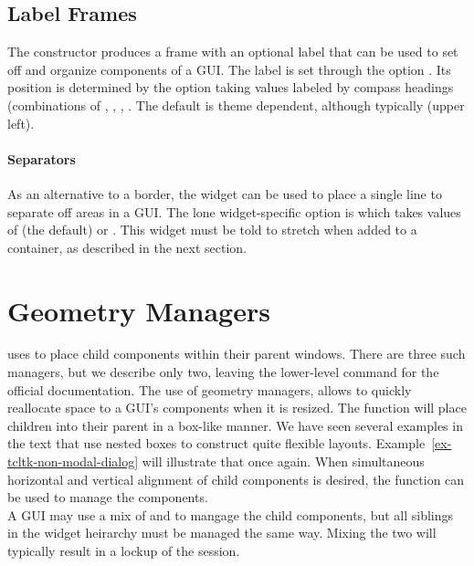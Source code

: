 \subsection{Label Frames}
\label{sec:tcltk:label-frames}

The  constructor produces a frame with an
optional label that can be used to set off and organize components of
a GUI. The label is set through the option
. Its position is determined by the option
 taking values labeled by compass
headings (combinations of , , , . The
default is theme dependent, although typically  (upper
left).

\paragraph{Separators}
As an alternative to a border, the  widget can be used
to place a single line to separate off areas in a GUI. The lone
widget-specific option is  which takes
values of  (the default) or . This
widget must be told to stretch when added to a container, as described
in the next section.

\section{Geometry Managers}
\label{sec:tcltk:geometry-managers}

\TCL\/ uses  to place child
components within their parent windows. There are three such managers,
but we describe only two, leaving the lower-level  command
for the official documentation. The use of geometry managers, allows
\TK\/ to quickly reallocate space to a GUI's components when it is
resized.  The  function will place children into
their parent in a box-like manner. We have seen several examples in
the text that use nested boxes to construct quite flexible layouts.
Example~\ref{ex-tcltk-non-modal-dialog} will illustrate that once
again. When simultaneous horizontal and vertical alignment of child
components is desired, the  function can be used to
manage the components.
\\

A GUI may use a mix of  and  to mangage the child components,
but all siblings in the widget heirarchy must be managed the same
way. Mixing the two will typically result in a lockup of the \R\/
session.


